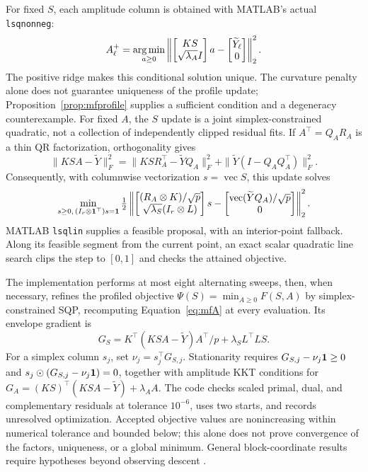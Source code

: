 For fixed $S$, each amplitude column is obtained with MATLAB's actual \texttt{lsqnonneg}:
\begin{equation}\label{eq:mfA}
 A_\ell^+=\operatorname*{arg\,min}_{a\geq0}
 \left\|\begin{bmatrix}KS\\\sqrt{\lambda_A}I\end{bmatrix}a
       -\begin{bmatrix}\widetilde Y_\ell\\0\end{bmatrix}\right\|_2^2.
\end{equation}
The positive ridge makes this conditional solution unique. The curvature penalty alone does not guarantee uniqueness of the profile update; Proposition~\ref{prop:mfprofile} supplies a sufficient condition and a degeneracy counterexample. For fixed $A$, the $S$ update is a joint simplex-constrained quadratic, not a collection of independently clipped residual fits. If $A^\top=Q_AR_A$ is a thin QR factorization, orthogonality gives
\begin{equation}\label{eq:mfqr}
 \|KSA-\widetilde Y\|_F^2
 =\|KS R_A^\top-\widetilde YQ_A\|_F^2+
   \|\widetilde Y(I-Q_AQ_A^\top)\|_F^2.
\end{equation}
Consequently, with columnwise vectorization $s=\operatorname{vec}S$, this update solves
\begin{equation}\label{eq:mfS}
 \min_{s\geq0,\,(I_r\otimes\mathbf{1}^\top)s=\mathbf{1}}
 \tfrac12\left\|
 \begin{bmatrix}(R_A\otimes K)/\sqrt p\\\sqrt{\lambda_S}(I_r\otimes L)\end{bmatrix}s
 -\begin{bmatrix}\operatorname{vec}(\widetilde YQ_A)/\sqrt p\\0\end{bmatrix}
 \right\|_2^2.
\end{equation}
MATLAB \texttt{lsqlin} supplies a feasible proposal, with an interior-point fallback. Along its feasible segment from the current point, an exact scalar quadratic line search clips the step to $[0,1]$ and checks the attained objective.

The implementation performs at most eight alternating sweeps, then, when necessary, refines the profiled objective $\Psi(S)=\min_{A\geq0}F(S,A)$ by simplex-constrained SQP, recomputing Equation~\eqref{eq:mfA} at every evaluation. Its envelope gradient is
\begin{equation}\label{eq:mfgrad}
 G_S=K^\top(KSA-\widetilde Y)A^\top/p+\lambda_SL^\top LS.
\end{equation}
For a simplex column $s_j$, set $\nu_j=s_j^\top G_{S,j}$. Stationarity requires $G_{S,j}-\nu_j\mathbf{1}\geq0$ and $s_j\odot(G_{S,j}-\nu_j\mathbf{1})=0$, together with amplitude KKT conditions for $G_A=(KS)^\top(KSA-\widetilde Y)+\lambda_AA$. The code checks scaled primal, dual, and complementary residuals at tolerance $10^{-6}$, uses two starts, and records unresolved optimization. Accepted objective values are nonincreasing within numerical tolerance and bounded below; this alone does not prove convergence of the factors, uniqueness, or a global minimum. General block-coordinate results require hypotheses beyond observing descent \cite{tseng}.

